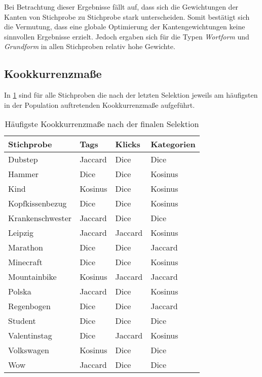 Bei Betrachtung dieser Ergebnisse fällt auf, dass sich die Gewichtungen der Kanten von Stichprobe zu Stichprobe stark unterscheiden. Somit bestätigt sich die Vermutung, dass eine globale Optimierung der Kantengewichtungen keine sinnvollen Ergebnisse erzielt. Jedoch ergaben sich für die Typen \emph{Wortform} und \emph{Grundform} in allen Stichproben relativ hohe Gewichte.



\subsection{Kookkurrenzmaße}

In \cref{tab:measures_each} sind für alle Stichproben die nach der letzten Selektion jeweils am häufigsten in der Population auftretenden Kookkurrenzmaße aufgeführt.

\begin{table}
\centering
\begin{tabular}{llll}
    \toprule
    Stichprobe & Tags & Klicks & Kategorien \\
    \midrule
    Dubstep & Jaccard & Dice & Dice \\
    Hammer & Dice & Dice & Kosinus \\
    Kind & Kosinus & Dice & Kosinus \\
    Kopfkissenbezug & Dice & Dice & Kosinus \\
    Krankenschwester & Jaccard & Dice & Dice \\
    Leipzig & Jaccard & Jaccard & Kosinus \\
    Marathon & Dice & Dice & Jaccard \\
    Minecraft & Dice & Dice & Kosinus \\
    Mountainbike & Kosinus & Jaccard & Jaccard \\
    Polska & Jaccard & Dice & Kosinus \\
    Regenbogen & Dice & Dice & Jaccard \\
    Student & Dice & Dice & Dice \\
    Valentinstag & Dice & Jaccard & Kosinus \\
    Volkswagen & Kosinus & Dice & Dice \\
    Wow & Jaccard & Dice & Dice \\
    \bottomrule
\end{tabular}
\caption{Häufigste Kookkurrenzmaße nach der finalen Selektion}
\label{tab:measures_each}
\end{table}

